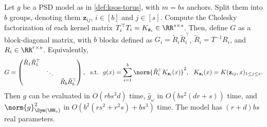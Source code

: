 \documentclass{article}
\begin{document}
\begin{proposition}\label{prop:bettermodels-blockdiag}
  Let $g$ be a PSD model as in \cref{def:ksos-torus}, with $m = bs$ anchors. Split them into $b$ groups, denoting them $\mathbf{z}_{ij}$, $i \in [b]$ and $j \in [s]$. Compute the Cholesky factorization of each kernel matrix $T_i^\top T_i = K_{\mathbf{z}_i} \in \RR^{s \times s}$. Then, define $G$ as a block-diagonal matrix, with $b$ blocks defined as $G_i = \tilde{R}_i \tilde{R}_i^\top$,  $\tilde{R}_i = T^{-1} R_i$, and $R_i \in \RR^{r \times s}$. Equivalently,
  \begin{equation}
    G = \begin{pmatrix}
      \tilde{R}_1 \tilde{R}_1^\top &        &                              \\
                                   & \ddots &                              \\
                                   &        & \tilde{R}_b \tilde{R}_b^\top
    \end{pmatrix},
    ~~\text{s.t.}~~
    g(x) = \sum_{i = 1}^b \norm{\tilde{R}_i^\top K_{\mathbf{z_i}}(x)}^2,
    ~~
    K_{\mathbf{z_i}}(x) = K(\mathbf{z}_{ij}, x)_{1 \leq j \leq s}.
  \end{equation}
  Then $g$ can be evaluated in $O(r b s^3 d)$ time, $\hat{g}_\omega$ in $O(b s^2 (d r + s))$ time, and $\norm{g}_{\Sym(\HH_s)}^2$ in $O(b^2 (r s^2 + r^2 s) + bs^3)$ time. The model has $(r+d)bs$ real parameters.
\end{proposition}
\end{document}
